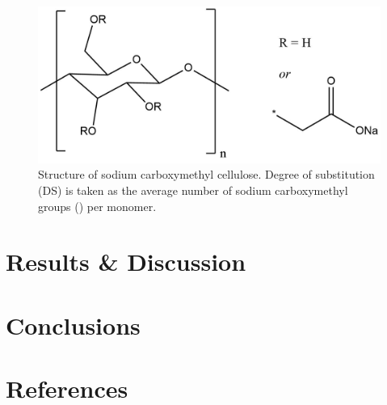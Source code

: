 \begin{figure}[h]
    \centering
    \includegraphics[width=0.8\columnwidth]{4-syntheses/figs/nc_structure.png}
    \caption{Structure of sodium carboxymethyl cellulose. Degree of substitution (DS) is taken as the average number of sodium carboxymethyl groups () per monomer.}
    \label{fig:nc_structure}
\end{figure}


\section{Results \& Discussion}






\section{Conclusions}

\section*{References}